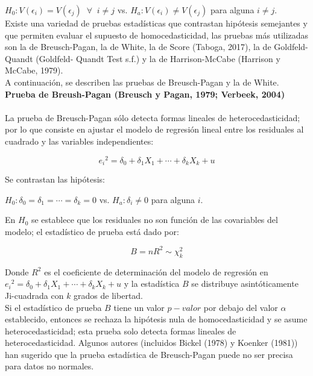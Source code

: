 $H_0: V(\epsilon_i) = V(\epsilon_j) \;\; \forall \;\; i \neq j$   vs.   $H_a: V(\epsilon_i) \neq V(\epsilon_j)$ para alguna $i \neq j$. \\

Existe una variedad de pruebas estadísticas que contrastan hipótesis semejantes y que permiten evaluar el supuesto de homocedasticidad, las pruebas más utilizadas son la de Breusch-Pagan, la de White, la de Score (Taboga, 2017), la de Goldfeld-Quandt (Goldfeld- Quandt Test s.f.) y la de Harrison-McCabe (Harrison y McCabe, 1979).\\

A continuación, se describen las pruebas de Breusch-Pagan y la de White.\\




\textbf{Prueba de Breush-Pagan (Breusch y Pagan, 1979; Verbeek, 2004)}\\\\

La prueba de Breusch-Pagan sólo detecta formas lineales de heterocedasticidad; por lo que consiste en ajustar el modelo de regresión lineal entre los residuales al cuadrado y las variables independientes:

\begin{center}
	$${e_i} ^2=\delta _0 + \delta _1 X_1+ \cdots + \delta _k X_k  + u$$
\end{center}

Se contrastan las hipótesis:\\

\begin{center}
	$H_0: \delta _0 = \delta _1 = \cdots =\delta _k=0 $  vs.  $H_a: \delta_i \neq 0$ para alguna $i$.
\end{center}


En $H_0$ se establece que los residuales no son función de las covariables del modelo; el estadístico de prueba está dado por:


\begin{center}
	$$B=n R ^2 \sim \chi_k ^2$$
\end{center}


Donde $R^2$ es el coeficiente de determinación del modelo de regresión en ${e_i} ^2=\delta _0 + \delta _1 X_1+ \cdots + \delta _k X_k  + u$ y la estadística $B$ se distribuye asintóticamente Ji-cuadrada con $k$ grados de libertad.\\

Si el estadístico de prueba $B$ tiene un valor $p-valor$  por debajo del valor $\alpha$ establecido, entonces se rechaza la hipótesis nula de homocedasticidad y se asume heterocedasticidad; esta prueba solo detecta formas lineales de heterocedasticidad. Algunos autores (incluidos Bickel (1978) y Koenker (1981)) han sugerido que la prueba estadística de Breusch-Pagan puede no ser precisa para datos no normales.\\


